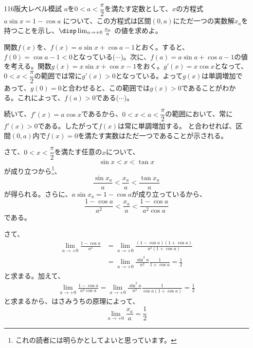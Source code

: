 \begin{prob}{116}{}{阪大レベル模試}
 $a$を$0<a<\dfrac{\pi}{2}$を満たす定数として、$x$の方程式 $a\sin x = 1-\cos a$ について、この方程式は区間$(0,a)$にただ一つの実数解$x_a$を持つことを示し、$\disp \lim_{a\to +0} \frac{x_a}{a}$ の値を求めよ。
\end{prob}

関数$f(x)$を、$f(x)=a\sin x+\cos a-1$とおく。すると、$f(0)=\cos a-1 < 0$となっている($\cdots$)。次に、$f(a)=a\sin a+\cos a-1$の値を考える。関数$g(x)=x\sin x+\cos x-1$をおく。$g'(x)=x\cos x$となって、$0<x<\dfrac{\pi}{2}$の範囲では常に$g'(x)>0$となっている。よって$g(x)$は単調増加であって、$g(0)=0$と合わせると、この範囲では$g(x)>0$であることがわかる。これによって、$f(a)>0$である($\cdots$)。

続いて、$f'(x)=a\cos x$であるから、$0<x<a<\dfrac{\pi}{2}$の範囲において、常に$f'(x)>0$である。したがって$f(x)$は常に単調増加する。 と合わせれば、区間$(0, a)$内で$f(x)=0$を満たす実数はただ一つであることが示される。

さて、$0<x<\dfrac{\pi}{2}$を満たす任意の$x$について、
\[ \sin x < x < \tan x \]
が成り立つから\footnote{これの読者には明らかとしてよいと思っています。}、
\[ \frac{\sin x_a}{a} < \frac{x_a}{a} < \frac{\tan x_a}{a} \]
が得られる。さらに、$a\sin x_a=1-\cos a$が成り立っているから、
\[ \frac{1-\cos a}{a^2} < \frac{x_a}{a} < \frac{1-\cos a}{a^2\cos a} \]
である。

さて、
\begin{align*}
 \lim_{a\to +0} \frac{1-\cos a}{a^2}&=\lim_{a\to +0} \frac{(1-\cos a)(1+\cos a)}{a^2(1+\cos a)} \\
 &= \lim_{a\to +0} \frac{\sin^2 a}{a^2} \frac{1}{1+\cos a} = \frac{1}{2}
\end{align*}
と求まる。加えて、
\begin{align*}
 \lim_{a\to +0} \frac{1-\cos a}{a^2\cos a}=\lim_{a\to +0} \frac{\sin^2 a}{a^2} \frac{1}{\cos a(1+\cos a)}=\frac{1}{2}
\end{align*}
と求まるから、はさみうちの原理によって、
\[ \lim_{a\to +0} \frac{x_a}{a} =\frac{1}{2} \]
